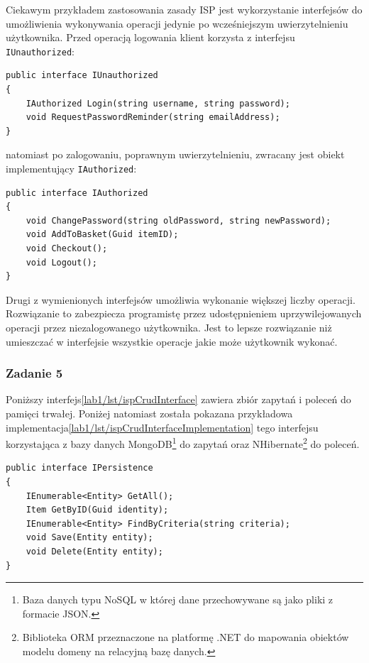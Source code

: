 Ciekawym przykładem zastosowania zasady ISP jest wykorzystanie interfejsów do umożliwienia wykonywania operacji jedynie po wcześniejszym uwierzytelnieniu użytkownika. Przed operacją logowania klient korzysta z interfejsu \texttt{IUnauthorized}:
\begin{lstlisting}
public interface IUnauthorized
{
	IAuthorized Login(string username, string password);
	void RequestPasswordReminder(string emailAddress);
}
\end{lstlisting}
natomiast po zalogowaniu, poprawnym uwierzytelnieniu, zwracany jest obiekt implementujący \texttt{IAuthorized}:
\begin{lstlisting}
public interface IAuthorized
{
	void ChangePassword(string oldPassword, string newPassword);
	void AddToBasket(Guid itemID);
	void Checkout();
	void Logout();
}
\end{lstlisting}
Drugi z wymienionych interfejsów umożliwia wykonanie większej liczby operacji. Rozwiązanie to zabezpiecza programistę przez udostępnieniem uprzywilejowanych operacji przez niezalogowanego użytkownika. Jest to lepsze rozwiązanie niż umieszczać w interfejsie wszystkie operacje jakie może użytkownik wykonać. 

\subsubsection{Zadanie 5}
Poniższy interfejs\ref{lab1/lst/ispCrudInterface} zawiera zbiór zapytań i poleceń do pamięci trwałej. Poniżej natomiast została pokazana przykładowa implementacja\ref{lab1/lst/ispCrudInterfaceImplementation} tego interfejsu korzystająca z bazy danych MongoDB\footnote{Baza danych typu NoSQL w której dane przechowywane są jako pliki z formacie JSON.} do zapytań oraz NHibernate\footnote{Biblioteka ORM przeznaczone na platformę .NET do mapowania obiektów modelu domeny na relacyjną bazę danych.} do poleceń.
\begin{lstlisting}[caption={Interfejs zawierający zbiór operacji CRUD}, label={lab1/lst/ispCrudInterface}]
public interface IPersistence
{
	IEnumerable<Entity> GetAll();
	Item GetByID(Guid identity);
	IEnumerable<Entity> FindByCriteria(string criteria);
	void Save(Entity entity);
	void Delete(Entity entity);
}
\end{lstlisting}

